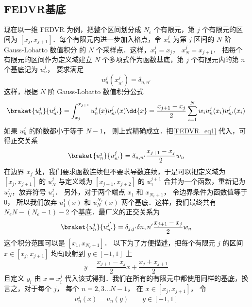 

\subsection{FEDVR基底}

现在以一维 FEDVR 为例，把整个区间划分成 $N_e$ 个有限元，第 $j$ 个有限元的区间为 $[x_j,x_{j+1}]$．每个有限元内进一步加入格点，令 $x_n^j$ 为第 $j$ 区间的 $N$ 阶 Gauss-Lobatto 数值积分 %
的 $N$ 个采样点．这样，$x_1^j=x_j$，  $x_N^j=x_{j+1}$． 把每个有限元的区间作为定义域建立 $N$ 个多项式作为函数基底，第 $j$ 个有限元内的第 $n$ 个基底记为 $u_n^j$， 要求满足
\begin{equation}\label{FEDVR_eq1}
u_n^j(x_{n'}^j) = \delta_{n,n'}
\end{equation}
这样，根据 $N$ 阶 Gauss-Lobatto 数值积分公式
\begin{equation}
\braket{u_n^j}{u_{n'}^j} = \int_{x_j}^{x_{j+1}} u_n^j(x) u_{n'}^j(x) \dd{x} = \frac{x_{j+1}-x_j}{2} \sum_{i=1}^{N} w_i u_n^j(x_i) u_{n'}^j (x_i)
\end{equation}
如果 $u_n^j$ 的阶数都小于等于 $N-1$， 则上式精确成立．把\autoref{FEDVR_eq1} 代入，可得正交关系
\begin{equation}
\braket{u_n^j}{u_{n'}^j} = \delta_{n,n'} \frac{x_{j+1}-x_j}{2} w_n
\end{equation}
在边界 $x_j$ 处，我们要求函数连续但不要求导数连续，于是可以把定义域为 $[x_j,x_{j+1}]$ 的 $u_N^j$  与定义域为 $[x_{j+1},x_{j+2}]$ 的 $u_1^{j+1}$ 合并为一个函数，重新记为 $u_N^j$，放弃符号 $u_1^j$． 另外，对于两个端点 $x_1$ 和 $x_{N_e+1}$， 令边界条件为函数值等于 0， 所以我们放弃 $u_1^1(x)$ 和 $u_N^{N_e}(x)$ 两个基底．这样，我们最终共有 $N_eN-(N_e-1)-2$ 个基底．最广义的正交关系为
\begin{equation}
\braket{u_n^j}{u_{n'}^{j'}} = \delta_{j,j'}\delta{n,n'} \frac{x_{j+1}-x_j}{2}w_n
\end{equation}
这个积分范围可以是 $[x_1, x_{N_e+1}]$． 以下为了方便描述，把每个有限元 $j$ 的区间 $ x\in[x_j,x_{j+1}]$ 均匀映射到 $y\in[-1,1]$ 上
\begin{equation}
y = \frac{x_{j+1}-x_j}{2} x + \frac{x_j+x_{j+1}}{2}
\end{equation}
且定义 $y_i$ 由 $x=x_i^j$ 代入该式得到．我们在所有的有限元中都使用同样的基底，换言之，对于每个 $j$， 每个 $n=2,3\dots N-1$， 在 $x\in[x_j,x_{j+1}]$， 令
\begin{equation}
u_n^j(x) = u_n(y) \qquad y\in[-1,1]
\end{equation}
